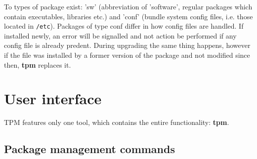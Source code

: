 \documentclass[a4paper]{article}
\newcommand{\file}[1]{\texttt{#1}}
\newcommand{\program}[1]{\textbf{#1}}
\begin{document}
	To types of package exist: 'sw' (abbreviation of 'software', regular packages which contain executables, libraries etc.) and 'conf' (bundle system config files, i.e. those located in \file{/etc}). Packages of type conf differ in how config files are handled. If installed newly, an error will be signalled and not action be performed if any config file is already predent. During upgrading the same thing happens, however if the file was installed by a former version of the package and not modified since then, \program{tpm} replaces it.
	
	\section{User interface}
	\label{sec:user_interface}
	
	TPM features only one tool, which contains the entire functionality: \program{tpm}.
	
	\subsection{Package management commands}
	\label{sec:package_management_commands}
	
\end{document}
